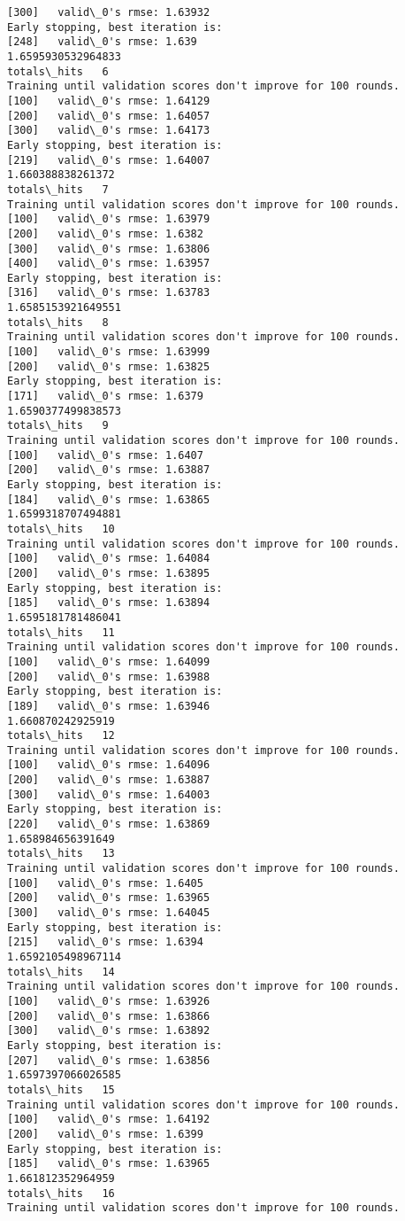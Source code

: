 \documentclass[11pt]{article}
\begin{document}
\begin{Verbatim}[commandchars=\\\{\}]
[300]	valid\_0's rmse: 1.63932
Early stopping, best iteration is:
[248]	valid\_0's rmse: 1.639
1.6595930532964833
totals\_hits   6
Training until validation scores don't improve for 100 rounds.
[100]	valid\_0's rmse: 1.64129
[200]	valid\_0's rmse: 1.64057
[300]	valid\_0's rmse: 1.64173
Early stopping, best iteration is:
[219]	valid\_0's rmse: 1.64007
1.660388838261372
totals\_hits   7
Training until validation scores don't improve for 100 rounds.
[100]	valid\_0's rmse: 1.63979
[200]	valid\_0's rmse: 1.6382
[300]	valid\_0's rmse: 1.63806
[400]	valid\_0's rmse: 1.63957
Early stopping, best iteration is:
[316]	valid\_0's rmse: 1.63783
1.6585153921649551
totals\_hits   8
Training until validation scores don't improve for 100 rounds.
[100]	valid\_0's rmse: 1.63999
[200]	valid\_0's rmse: 1.63825
Early stopping, best iteration is:
[171]	valid\_0's rmse: 1.6379
1.6590377499838573
totals\_hits   9
Training until validation scores don't improve for 100 rounds.
[100]	valid\_0's rmse: 1.6407
[200]	valid\_0's rmse: 1.63887
Early stopping, best iteration is:
[184]	valid\_0's rmse: 1.63865
1.6599318707494881
totals\_hits   10
Training until validation scores don't improve for 100 rounds.
[100]	valid\_0's rmse: 1.64084
[200]	valid\_0's rmse: 1.63895
Early stopping, best iteration is:
[185]	valid\_0's rmse: 1.63894
1.6595181781486041
totals\_hits   11
Training until validation scores don't improve for 100 rounds.
[100]	valid\_0's rmse: 1.64099
[200]	valid\_0's rmse: 1.63988
Early stopping, best iteration is:
[189]	valid\_0's rmse: 1.63946
1.660870242925919
totals\_hits   12
Training until validation scores don't improve for 100 rounds.
[100]	valid\_0's rmse: 1.64096
[200]	valid\_0's rmse: 1.63887
[300]	valid\_0's rmse: 1.64003
Early stopping, best iteration is:
[220]	valid\_0's rmse: 1.63869
1.658984656391649
totals\_hits   13
Training until validation scores don't improve for 100 rounds.
[100]	valid\_0's rmse: 1.6405
[200]	valid\_0's rmse: 1.63965
[300]	valid\_0's rmse: 1.64045
Early stopping, best iteration is:
[215]	valid\_0's rmse: 1.6394
1.6592105498967114
totals\_hits   14
Training until validation scores don't improve for 100 rounds.
[100]	valid\_0's rmse: 1.63926
[200]	valid\_0's rmse: 1.63866
[300]	valid\_0's rmse: 1.63892
Early stopping, best iteration is:
[207]	valid\_0's rmse: 1.63856
1.6597397066026585
totals\_hits   15
Training until validation scores don't improve for 100 rounds.
[100]	valid\_0's rmse: 1.64192
[200]	valid\_0's rmse: 1.6399
Early stopping, best iteration is:
[185]	valid\_0's rmse: 1.63965
1.661812352964959
totals\_hits   16
Training until validation scores don't improve for 100 rounds.

\end{Verbatim}
\end{document}

